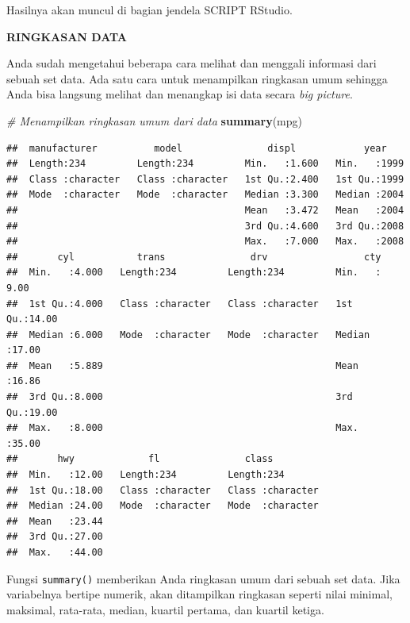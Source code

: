 \documentclass[openany]{book}
\newenvironment{Shaded}{\begin{snugshade}}{\end{snugshade}}
\newcommand{\KeywordTok}[1]{\textcolor[rgb]{0.13,0.29,0.53}{\textbf{#1}}}
\newcommand{\CommentTok}[1]{\textcolor[rgb]{0.56,0.35,0.01}{\textit{#1}}}
\newcommand{\NormalTok}[1]{#1}
\begin{document}
Hasilnya akan muncul di bagian jendela SCRIPT RStudio.

\textbf{RINGKASAN DATA}

Anda sudah mengetahui beberapa cara melihat dan menggali informasi dari
sebuah set data. Ada satu cara untuk menampilkan ringkasan umum sehingga
Anda bisa langsung melihat dan menangkap isi data secara \emph{big
picture}.

\begin{Shaded}
\begin{Highlighting}[]
\CommentTok{# Menampilkan ringkasan umum dari data}
\KeywordTok{summary}\NormalTok{(mpg)}
\end{Highlighting}
\end{Shaded}

\begin{verbatim}
##  manufacturer          model               displ            year     
##  Length:234         Length:234         Min.   :1.600   Min.   :1999  
##  Class :character   Class :character   1st Qu.:2.400   1st Qu.:1999  
##  Mode  :character   Mode  :character   Median :3.300   Median :2004  
##                                        Mean   :3.472   Mean   :2004  
##                                        3rd Qu.:4.600   3rd Qu.:2008  
##                                        Max.   :7.000   Max.   :2008  
##       cyl           trans               drv                 cty       
##  Min.   :4.000   Length:234         Length:234         Min.   : 9.00  
##  1st Qu.:4.000   Class :character   Class :character   1st Qu.:14.00  
##  Median :6.000   Mode  :character   Mode  :character   Median :17.00  
##  Mean   :5.889                                         Mean   :16.86  
##  3rd Qu.:8.000                                         3rd Qu.:19.00  
##  Max.   :8.000                                         Max.   :35.00  
##       hwy             fl               class          
##  Min.   :12.00   Length:234         Length:234        
##  1st Qu.:18.00   Class :character   Class :character  
##  Median :24.00   Mode  :character   Mode  :character  
##  Mean   :23.44                                        
##  3rd Qu.:27.00                                        
##  Max.   :44.00
\end{verbatim}

Fungsi \texttt{summary()} memberikan Anda ringkasan umum dari sebuah set
data. Jika variabelnya bertipe numerik, akan ditampilkan ringkasan
seperti nilai minimal, maksimal, rata-rata, median, kuartil pertama, dan
kuartil ketiga.
\end{document}
